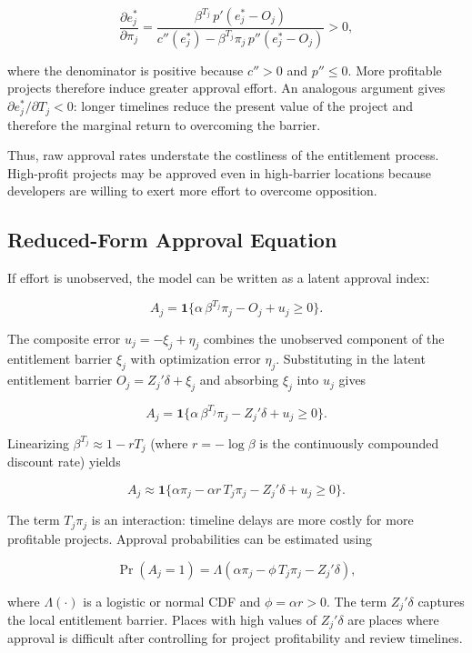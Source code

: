 \documentclass[12pt]{article}
\theoremstyle{definition}
\begin{document}
\[
\frac{\partial e_j^*}{\partial \pi_j}
=
\frac{\beta^{T_j}\,p'(e_j^* - O_j)}{c''(e_j^*) - \beta^{T_j}\pi_j\,p''(e_j^* - O_j)} > 0,
\]

where the denominator is positive because $c''>0$ and $p''\leq 0$. More profitable projects therefore induce greater approval effort. An analogous argument gives $\partial e_j^*/\partial T_j < 0$: longer timelines reduce the present value of the project and therefore the marginal return to overcoming the barrier.

Thus, raw approval rates understate the costliness of the entitlement process. High-profit projects may be approved even in high-barrier locations because developers are willing to exert more effort to overcome opposition.

\subsection{Reduced-Form Approval Equation}

If effort is unobserved, the model can be written as a latent approval index:

\[
A_j = \mathbf{1}\{\alpha\,\beta^{T_j}\pi_j - O_j + u_j \geq 0\}.
\]

The composite error $u_j = -\xi_j + \eta_j$ combines the unobserved component of the entitlement barrier $\xi_j$ with optimization error $\eta_j$. Substituting in the latent entitlement barrier $O_j = Z_j'\delta + \xi_j$ and absorbing $\xi_j$ into $u_j$ gives

\[
A_j = \mathbf{1}\{\alpha\,\beta^{T_j}\pi_j - Z_j'\delta + u_j \geq 0\}.
\]

Linearizing $\beta^{T_j} \approx 1 - rT_j$ (where $r = -\log\beta$ is the continuously compounded discount rate) yields

\[
A_j \approx \mathbf{1}\bigl\{\alpha\pi_j - \alpha r\,T_j\pi_j - Z_j'\delta + u_j \geq 0\bigr\}.
\]

The term $T_j\pi_j$ is an interaction: timeline delays are more costly for more profitable projects. Approval probabilities can be estimated using

\[
\Pr(A_j = 1)
=
\Lambda\!\left(\alpha \pi_j - \phi\,T_j\pi_j - Z_j'\delta \right),
\]

where $\Lambda(\cdot)$ is a logistic or normal CDF and $\phi = \alpha r > 0$. The term $Z_j'\delta$ captures the local entitlement barrier. Places with high values of $Z_j'\delta$ are places where approval is difficult after controlling for project profitability and review timelines.
\end{document}
